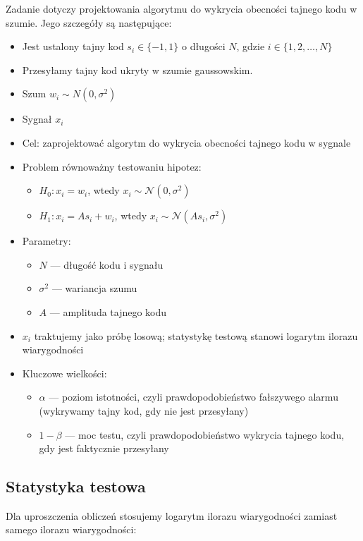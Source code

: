 \documentclass[12pt,a4paper]{article}
\begin{document}
Zadanie dotyczy projektowania algorytmu do wykrycia obecności tajnego kodu w szumie. Jego szczegóły są następujące:
\begin{itemize}
    \item Jest ustalony tajny kod $s_i \in \{-1, 1\}$ o długości $N$, gdzie $i \in \{1, 2, \ldots, N\}$
    \item Przesyłamy tajny kod ukryty w szumie gaussowskim.
    \item Szum $w_i \sim N(0, \sigma^2)$
    \item Sygnał $x_i$
    \item Cel: zaprojektować algorytm do wykrycia obecności tajnego kodu w sygnale
    \item Problem równoważny testowaniu hipotez:
    \begin{itemize}
        \item $H_0: x_i = w_i$, wtedy $x_i \sim \mathcal{N}(0, \sigma^2)$
        \item $H_1: x_i = A s_i + w_i$, wtedy $x_i \sim \mathcal{N}(A s_i, \sigma^2)$
    \end{itemize}
    \item Parametry:
    \begin{itemize}
        \item $N$ --- długość kodu i sygnału
        \item $\sigma^2$ --- wariancja szumu
        \item $A$ --- amplituda tajnego kodu
    \end{itemize}
    \item $x_i$ traktujemy jako próbę losową; statystykę testową stanowi logarytm ilorazu wiarygodności
    \item Kluczowe wielkości:
    \begin{itemize}
        \item $\alpha$ --- poziom istotności, czyli prawdopodobieństwo fałszywego alarmu (wykrywamy tajny kod, gdy nie jest przesyłany)
        \item $1-\beta$ --- moc testu, czyli prawdopodobieństwo wykrycia tajnego kodu, gdy jest faktycznie przesyłany
    \end{itemize}
\end{itemize}

\subsection{Statystyka testowa}

Dla uproszczenia obliczeń stosujemy logarytm ilorazu wiarygodności zamiast samego ilorazu wiarygodności:
\end{document}
